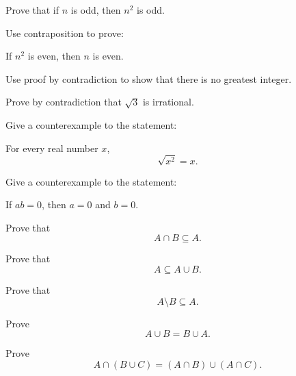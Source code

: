 \begin{exercise}[2]
Prove that if \(n\) is odd, then \(n^2\) is odd.
\end{exercise}

\begin{exercise}[2]
Use contraposition to prove:

If \(n^2\) is even, then \(n\) is even.
\end{exercise}

\begin{exercise}[2]
Use proof by contradiction to show that there is no greatest integer.
\end{exercise}

\begin{exercise}[2]
Prove by contradiction that \(\sqrt3\) is irrational.
\end{exercise}

\begin{exercise}[1]
Give a counterexample to the statement:

\begin{center}
For every real number \(x\),
\[ \sqrt{x^2}=x. \]
\end{center}
\end{exercise}

\begin{exercise}[1]
Give a counterexample to the statement:

\begin{center}
If \(ab=0\), then \(a=0\) and \(b=0\).
\end{center}
\end{exercise}

\begin{exercise}[2]
Prove that
\[ A\cap B\subseteq A. \]
\end{exercise}

\begin{exercise}[2]
Prove that
\[ A\subseteq A\cup B. \]
\end{exercise}

\begin{exercise}[2]
Prove that
\[ A\setminus B\subseteq A. \]
\end{exercise}

\begin{exercise}[2]
Prove
\[ A\cup B=B\cup A. \]
\end{exercise}

\begin{exercise}[3]
Prove
\[ A\cap(B\cup C)=(A\cap B)\cup(A\cap C). \]
\end{exercise}

